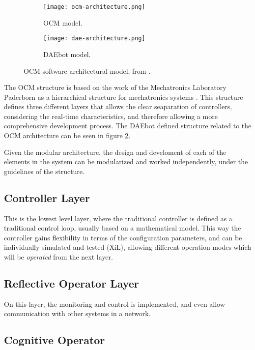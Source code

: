 \begin{figure}[htp]
	\centering
	\begin{subfigure}{0.5\textwidth}
		\centering
		\texttt{[image: ocm-architecture.png]}
		\caption{OCM model.} \label{fig:ocm-architecture}
	\end{subfigure}%
	\begin{subfigure}{0.5\textwidth}
		\centering
		\texttt{[image: dae-architecture.png]}
		\caption{DAEbot model.} \label{fig:dae-architecture}
	\end{subfigure}%
	\caption{OCM software architectural model, from \cite{Wiki}.} \label{fig:ocm-dae}
\end{figure}%

The OCM structure is based on the work of the Mechatronics Laboratory Paderborn as a hierarchical
structure for mechatronics systems \cite{Lueckel2001}. This structure defines three different layers
that allows the clear seaparation of controllers, considering the real-time characteristics, and
therefore allowing a more comprehensive development process. The DAEbot defined structure related to
the OCM architecture can be seen in figure \ref{fig:dae-architecture}.

Given the modular architecture, the design and develoment of each of the elements in the system can
be modularized and worked independently, under the guidelines of the structure.

\subsection*{Controller Layer}

This is the lowest level layer, where the traditional controller is defined as a traditional control
loop, usually based on a mathematical model. This way the controller gains flexibility in terms of
the configuration parameters, and can be individually simulated and tested (XiL), allowing different
operation modes which will be \textit{operated} from the next layer.

\subsection*{Reflective Operator Layer}

On this layer, the monitoring and control is implemented, and even allow communication with other
systems in a network.

\subsection*{Cognitive Operator}

